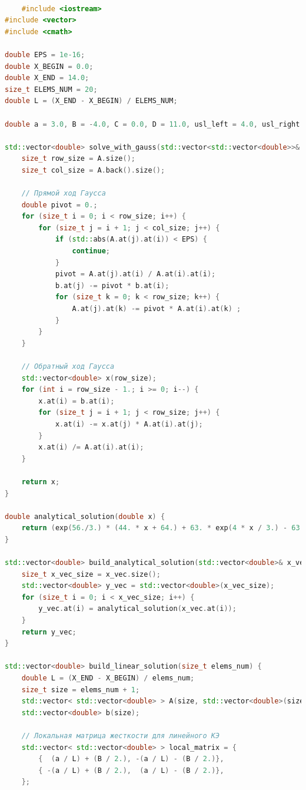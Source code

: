 \begin{lstlisting}[language=c++, label=prog,caption={\textit{Реализация МКЭ}}]

	#include <iostream>
#include <vector>
#include <cmath>

double EPS = 1e-16;
double X_BEGIN = 0.0;
double X_END = 14.0;
size_t ELEMS_NUM = 20;
double L = (X_END - X_BEGIN) / ELEMS_NUM;

double a = 3.0, B = -4.0, C = 0.0, D = 11.0, usl_left = 4.0, usl_right = 8.0; // au"+Bu'+Cu+D=0

std::vector<double> solve_with_gauss(std::vector<std::vector<double>>& A, std::vector<double>& b){
    size_t row_size = A.size();
    size_t col_size = A.back().size();

    // Прямой ход Гаусса
    double pivot = 0.;
    for (size_t i = 0; i < row_size; i++) {
        for (size_t j = i + 1; j < col_size; j++) {
            if (std::abs(A.at(j).at(i)) < EPS) {
                continue;
            }
            pivot = A.at(j).at(i) / A.at(i).at(i);
            b.at(j) -= pivot * b.at(i);
            for (size_t k = 0; k < row_size; k++) {
                A.at(j).at(k) -= pivot * A.at(i).at(k) ;
            }
        }
    }

    // Обратный ход Гаусса
    std::vector<double> x(row_size);
    for (int i = row_size - 1.; i >= 0; i--) {
        x.at(i) = b.at(i);
        for (size_t j = i + 1; j < row_size; j++) {
            x.at(i) -= x.at(j) * A.at(i).at(j);
        }
        x.at(i) /= A.at(i).at(i);
    }

    return x;
}

double analytical_solution(double x) {
    return (exp(56./3.) * (44. * x + 64.) + 63. * exp(4 * x / 3.) - 63.)/(16. * exp(56./3.));
}

std::vector<double> build_analytical_solution(std::vector<double>& x_vec) {
    size_t x_vec_size = x_vec.size();
    std::vector<double> y_vec = std::vector<double>(x_vec_size);
    for (size_t i = 0; i < x_vec_size; i++) {
        y_vec.at(i) = analytical_solution(x_vec.at(i));
    }
    return y_vec;
}

std::vector<double> build_linear_solution(size_t elems_num) {
    double L = (X_END - X_BEGIN) / elems_num;
    size_t size = elems_num + 1;
    std::vector< std::vector<double> > A(size, std::vector<double>(size));
    std::vector<double> b(size);

    // Локальная матрица жесткости для линейного КЭ
    std::vector< std::vector<double> > local_matrix = {
        {  (a / L) + (B / 2.), -(a / L) - (B / 2.)},
        { -(a / L) + (B / 2.),  (a / L) - (B / 2.)},
    };


\end{lstlisting}
